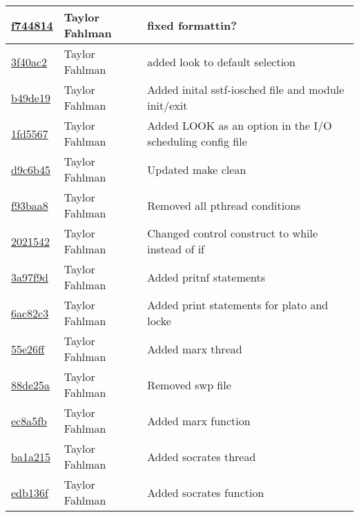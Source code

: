 \begin{tabular}{l l l}
\href{git@github.com:fahlmant/cs444/commit/f744814a5f73441d92f08e7ec4c1734b8effe233}{f744814} & Taylor Fahlman & fixed formattin?\\\hline
\href{git@github.com:fahlmant/cs444/commit/3f40ac2f576b2250e924524e3c7973a7b57b99dc}{3f40ac2} & Taylor Fahlman & added look to default selection\\\hline
\href{git@github.com:fahlmant/cs444/commit/b49de190dda284a50bb2738f40b8436171b9d691}{b49de19} & Taylor Fahlman & Added inital sstf-iosched file and module init/exit\\\hline
\href{git@github.com:fahlmant/cs444/commit/1fd55679562034d28fcfbb6e2ac1642c5c88dfc9}{1fd5567} & Taylor Fahlman & Added LOOK as an option in the I/O scheduling config file\\\hline
\href{git@github.com:fahlmant/cs444/commit/d9c6b45e2f1eee4649ad42b115e750bd68d2622a}{d9c6b45} & Taylor Fahlman & Updated make clean\\\hline
\href{git@github.com:fahlmant/cs444/commit/f93baa8e24785744b1f3ae51ec64e45e62e6ea6e}{f93baa8} & Taylor Fahlman & Removed all pthread conditions\\\hline
\href{git@github.com:fahlmant/cs444/commit/2021542aebdf6ed1edee48fec117909c7b9926da}{2021542} & Taylor Fahlman & Changed control construct to while instead of if\\\hline
\href{git@github.com:fahlmant/cs444/commit/3a97f9ddf3e62cf13f868b6554fa48b76e200e64}{3a97f9d} & Taylor Fahlman & Added pritnf statements\\\hline
\href{git@github.com:fahlmant/cs444/commit/6ac82c37f00e5ac3d70cc9fce0cdd69a4b09a1c0}{6ac82c3} & Taylor Fahlman & Added print statements for plato and locke\\\hline
\href{git@github.com:fahlmant/cs444/commit/55e26ff34cc7fc3159c10da1add5024754667dbd}{55e26ff} & Taylor Fahlman & Added marx thread\\\hline
\href{git@github.com:fahlmant/cs444/commit/88de25a62a2e699650bc207419b2b384abc5a748}{88de25a} & Taylor Fahlman & Removed swp file\\\hline
\href{git@github.com:fahlmant/cs444/commit/ec8a5fbea281d6bffd2f3df386889152fadb13bc}{ec8a5fb} & Taylor Fahlman & Added marx function\\\hline
\href{git@github.com:fahlmant/cs444/commit/ba1a2150d205c820597bf84f89c025edfb785238}{ba1a215} & Taylor Fahlman & Added socrates thread\\\hline
\href{git@github.com:fahlmant/cs444/commit/edb136fac1c4ed5c5317f7a7a967bad090b32c86}{edb136f} & Taylor Fahlman & Added socrates function\\\hline

\end{tabular}
